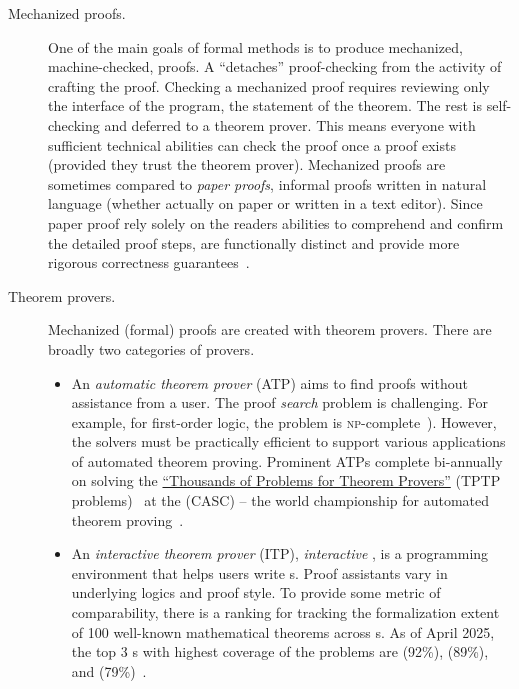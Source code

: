\begin{description}
\item[Mechanized proofs.]
One of the main goals of formal methods is to produce mechanized, \ie
machine-checked, proofs. A  \enquote{detaches}
proof-checking from the activity of crafting the proof. Checking a mechanized
proof requires reviewing only the interface of the program, \ie the statement of
the theorem. The rest is self-checking and deferred to a theorem prover. This
means everyone with sufficient technical abilities can check the proof once a
proof exists (provided they trust the theorem prover). Mechanized
proofs are sometimes compared to \emph{paper proofs},
\ie informal proofs written in natural language (whether actually on paper or
written in a text editor). Since paper proof rely solely on the readers
abilities to comprehend and confirm the detailed proof steps,  are functionally distinct and provide more rigorous correctness
guarantees~\cite{gonthier2008}.

\item[Theorem provers.]
Mechanized (formal) proofs are created with theorem
provers. There are broadly two categories of provers.

\begin{itemize}
\item An \emph{automatic theorem prover} (ATP)
aims to find proofs without assistance from a user. The proof \emph{search}
problem is challenging. For example, for first-order logic, the problem is
\textsc{np}-complete~\cite{cook1971,
levin1973}). However, the solvers must be
practically efficient to support various applications of automated theorem
proving. Prominent ATPs complete bi-annually on solving the
\href{https://www.tptp.org}{\enquote{Thousands of Problems for Theorem Provers}}
(TPTP problems)~\cite{sutcliffe2024} at the
\href{https://tptp.org/CASC/}{} (CASC) -- the
world championship for automated theorem proving~\cite{casc}.

\item An \emph{interactive theorem prover}
(ITP), \aka \emph{interactive }, is a programming
environment that helps users write s. Proof assistants
vary in underlying logics and proof style. To provide some metric of
comparability, there is a ranking for tracking the formalization extent of 100
well-known mathematical theorems across s. As of April 2025, the
top 3 s with highest coverage of the problems are 
(92\%),  (89\%), and  (79\%)~\cite{hundredtheorems}.
\end{itemize}


\end{description}
